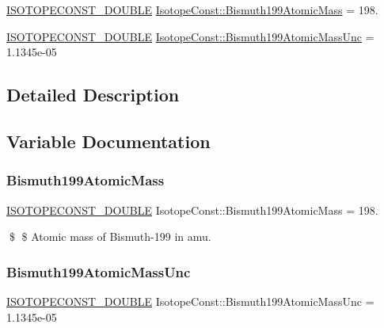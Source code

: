 \begin{DoxyCompactItemize}
\item 
\mbox{\hyperlink{group___isotope_const-_macros_ga8f45a7272ce02c0b4c65c44636ed719a}{I\+S\+O\+T\+O\+P\+E\+C\+O\+N\+S\+T\+\_\+\+D\+O\+U\+B\+LE}} \mbox{\hyperlink{group___isotope_const-_bismuth-_bi199_ga7d6313079a3c3ff80c9ecc9bd147c104}{Isotope\+Const\+::\+Bismuth199\+Atomic\+Mass}} = 198.
\item 
\mbox{\hyperlink{group___isotope_const-_macros_ga8f45a7272ce02c0b4c65c44636ed719a}{I\+S\+O\+T\+O\+P\+E\+C\+O\+N\+S\+T\+\_\+\+D\+O\+U\+B\+LE}} \mbox{\hyperlink{group___isotope_const-_bismuth-_bi199_gafb3009eb5075c56b73bd4e0dd8c14ba1}{Isotope\+Const\+::\+Bismuth199\+Atomic\+Mass\+Unc}} = 1.\+1345e-\/05
\end{DoxyCompactItemize}


\subsection{Detailed Description}


\subsection{Variable Documentation}
\mbox{\label{group___isotope_const-_bismuth-_bi199_ga7d6313079a3c3ff80c9ecc9bd147c104}} 
\subsubsection{\texorpdfstring{Bismuth199\+Atomic\+Mass}{Bismuth199AtomicMass}}
{\footnotesize\ttfamily \mbox{\hyperlink{group___isotope_const-_macros_ga8f45a7272ce02c0b4c65c44636ed719a}{I\+S\+O\+T\+O\+P\+E\+C\+O\+N\+S\+T\+\_\+\+D\+O\+U\+B\+LE}} Isotope\+Const\+::\+Bismuth199\+Atomic\+Mass = 198.}

\$ \$ Atomic mass of Bismuth-\/199 in amu. \mbox{\label{group___isotope_const-_bismuth-_bi199_gafb3009eb5075c56b73bd4e0dd8c14ba1}} 
\subsubsection{\texorpdfstring{Bismuth199\+Atomic\+Mass\+Unc}{Bismuth199AtomicMassUnc}}
{\footnotesize\ttfamily \mbox{\hyperlink{group___isotope_const-_macros_ga8f45a7272ce02c0b4c65c44636ed719a}{I\+S\+O\+T\+O\+P\+E\+C\+O\+N\+S\+T\+\_\+\+D\+O\+U\+B\+LE}} Isotope\+Const\+::\+Bismuth199\+Atomic\+Mass\+Unc = 1.\+1345e-\/05}

